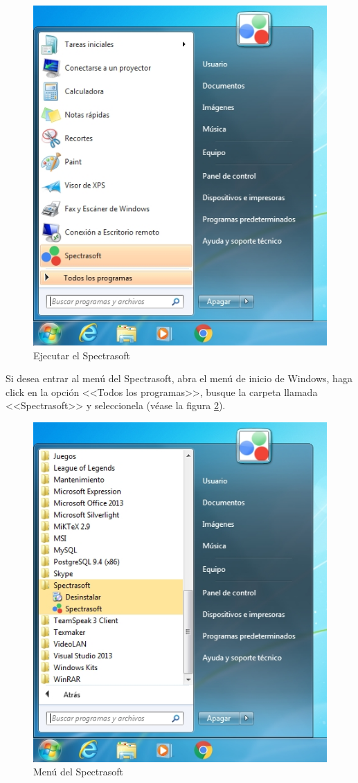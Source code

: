 \begin{figure}[H]
  \centering
  \includegraphics[width=.4\linewidth]{./img/spectrasoft-ejecutable.jpg}
\caption[Ejecutar el Spectrasoft]{Ejecutar el Spectrasoft\label{fig:spectrasoft-ejecutable}}
\end{figure}

Si desea entrar al men\'{u} del Spectrasoft, abra el men\'{u} de inicio de Windows, haga click en la opci\'{o}n <<Todos los programas>>, busque la carpeta llamada <<Spectrasoft>> y seleccionela (v\'{e}ase la figura \ref{fig:spectrasoft-menu}).

\begin{figure}[H]
  \centering
  \includegraphics[width=.4\linewidth]{./img/spectrasoft-menu.jpg}
\caption[Men\'{u} del Spectrasoft]{Men\'{u} del Spectrasoft\label{fig:spectrasoft-menu}}
\end{figure}